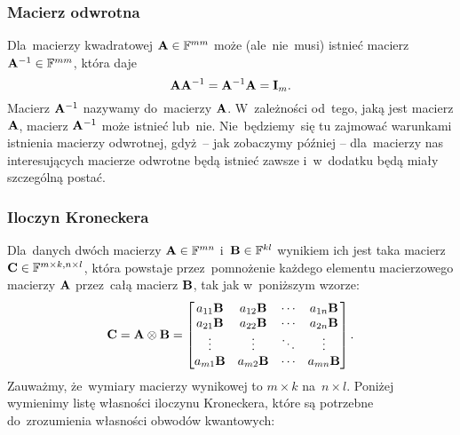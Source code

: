 \subsubsection{Macierz odwrotna}
Dla~macierzy kwadratowej $\mathbf{A}\in \mathbb{F}^{mm}$ może (ale~nie~musi) istnieć macierz $\mathbf{A}^{-1}\in \mathbb{F}^{mm}$, która daje
$$
	\mathbf{A}\mathbf{A}^{-1} = \mathbf{A}^{-1}\mathbf{A} = \mathbf{I}_m.
$$
Macierz $\mathbf{A}^{-1}$ nazywamy  do~macierzy $\mathbf{A}$.
W~zależności od~tego, jaką jest macierz $\mathbf{A}$,
macierz $\mathbf{A}^{-1}$ może istnieć lub~nie. Nie~będziemy~się tu zajmować
warunkami istnienia macierzy odwrotnej, gdyż~-- jak zobaczymy później --
dla~macierzy nas interesujących macierze odwrotne będą istnieć zawsze i~w~dodatku
będą miały szczególną postać.

\subsubsection{Iloczyn Kroneckera}
Dla~danych dwóch macierzy $\mathbf{A}\in\mathbb{F}^{mn}$ i~$\mathbf{B}\in\mathbb{F}^{kl}$
wynikiem ich  jest taka macierz
$\mathbf{C}\in\mathbb{F}^{m\times k, n\times l}$, która
powstaje przez~pomnożenie każdego elementu macierzowego macierzy $\mathbf{A}$
przez~całą macierz $\mathbf{B}$, tak jak w~poniższym wzorze:
$$
	\mathbf{C}=\mathbf{A}\otimes \mathbf{B}=
	\begin{bmatrix}
		a_{11}\mathbf{B} & a_{12}\mathbf{B} & \cdots & a_{1n}\mathbf{B} \\
		a_{21}\mathbf{B} & a_{22}\mathbf{B} & \cdots & a_{2n}\mathbf{B} \\
		\vdots        & \vdots        & \ddots & \vdots        \\
		a_{m1}\mathbf{B} & a_{m2}\mathbf{B} & \cdots & a_{mn}\mathbf{B} \\
	\end{bmatrix}.
$$
Zauważmy, że~wymiary macierzy wynikowej to $m\times k$ na~$n\times l$. Poniżej
wymienimy listę własności iloczynu Kroneckera, które są potrzebne
do~zrozumienia własności obwodów kwantowych:

